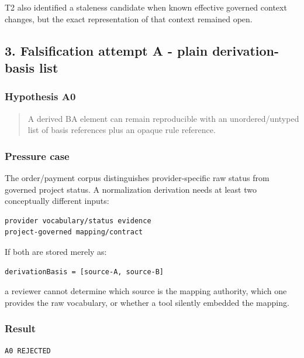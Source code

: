 \documentclass[11pt,a4paper]{article}
\begin{document}
T2 also identified a staleness candidate when known effective governed
context changes, but the exact representation of that context remained
open.

\subsection{3. Falsification attempt A - plain derivation-basis
list}\label{falsification-attempt-a---plain-derivation-basis-list}

\subsubsection{Hypothesis A0}\label{hypothesis-a0}

\begin{quote}
A derived BA element can remain reproducible with an unordered/untyped
list of basis references plus an opaque rule reference.
\end{quote}

\subsubsection{Pressure case}\label{pressure-case}

The order/payment corpus distinguishes provider-specific raw status from
governed project status. A normalization derivation needs at least two
conceptually different inputs:

\begin{verbatim}
provider vocabulary/status evidence
project-governed mapping/contract
\end{verbatim}

If both are stored merely as:

\begin{verbatim}
derivationBasis = [source-A, source-B]
\end{verbatim}

a reviewer cannot determine which source is the mapping authority, which
one provides the raw vocabulary, or whether a tool silently embedded the
mapping.

\subsubsection{Result}\label{result}

\begin{verbatim}
A0 REJECTED
\end{verbatim}
\end{document}
